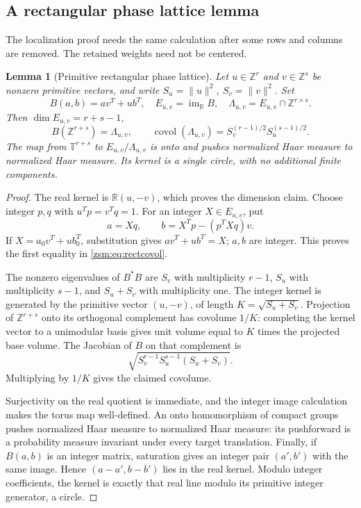 \documentclass[11pt]{article}
\newtheorem{lemma}[theorem]{Lemma}
\theoremstyle{definition}\newtheorem{definition}[theorem]{Definition}
\theoremstyle{remark}\newtheorem{remark}[theorem]{Remark}
\newcommand{\R}{\mathbb R}
\newcommand{\Z}{\mathbb Z}
\newcommand{\T}{\mathbb T}
\newcommand{\covol}{\operatorname{covol}}
\begin{document}
\subsection{A rectangular phase lattice lemma}\label{zsm:sec:rectlattice}
The localization proof needs the same calculation after some rows and columns
are removed. The retained weights need not be centered.

\begin{lemma}[Primitive rectangular phase lattice]\label{zsm:lem:rectlattice}
Let $u\in\Z^r$ and $v\in\Z^s$ be nonzero primitive vectors, and write
$S_u=\|u\|^2$, $S_v=\|v\|^2$. Set
\[
 B(a,b)=av^T+ub^T,\quad E_{u,v}=\operatorname{im}_{\R} B,\quad
 \Lambda_{u,v}=E_{u,v}\cap\Z^{r\times s}.
\]
Then $\dim E_{u,v}=r+s-1$,
\begin{equation}\label{zsm:eq:rectcovol}
 B(\Z^{r+s})=\Lambda_{u,v},\qquad
 \covol(\Lambda_{u,v})=S_v^{(r-1)/2}S_u^{(s-1)/2}.
\end{equation}
The map from $\T^{r+s}$ to $E_{u,v}/\Lambda_{u,v}$ is onto and pushes normalized
Haar measure to normalized Haar measure. Its kernel is a single circle, with
no additional finite components.
\end{lemma}
\begin{proof}
The real kernel is $\R(u,-v)$, which proves the dimension claim. Choose integer
$p,q$ with $u^Tp=v^Tq=1$. For an integer $X\in E_{u,v}$, put
\[
 a=Xq,\qquad b=X^Tp-(p^TXq)v.
\]
If $X=a_0v^T+ub_0^T$, substitution gives $av^T+ub^T=X$; $a,b$ are integer.
This proves the first equality in \eqref{zsm:eq:rectcovol}.

The nonzero eigenvalues of $B^*B$ are
$S_v$ with multiplicity $r-1$, $S_u$ with multiplicity $s-1$, and
$S_u+S_v$ with multiplicity one. The integer kernel is generated by the
primitive vector $(u,-v)$, of length $K=\sqrt{S_u+S_v}$. Projection of
$\Z^{r+s}$ onto its orthogonal complement has covolume $1/K$: completing the
kernel vector to a unimodular basis gives unit volume equal to $K$ times the
projected base volume. The Jacobian of $B$ on that complement is
\[
 \sqrt{S_v^{r-1}S_u^{s-1}(S_u+S_v)}.
\]
Multiplying by $1/K$ gives the claimed covolume.

Surjectivity on the real quotient is immediate, and the integer image
calculation makes the torus map well-defined. An onto homomorphism of compact
groups pushes normalized Haar measure to normalized Haar measure: its
pushforward is a probability measure invariant under every target translation.
Finally, if $B(a,b)$ is an integer matrix, saturation gives an integer pair
$(a',b')$ with the same image. Hence $(a-a',b-b')$ lies in the real kernel.
Modulo integer coefficients, the kernel is exactly that real line modulo its
primitive integer generator, a circle.
\end{proof}
\end{document}
